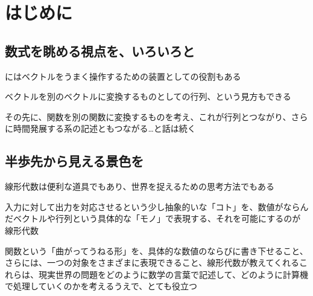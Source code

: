 \documentclass[../book_half_step_linear]{subfiles}
\begin{document}
\section{はじめに}

\subsection{数式を眺める視点を、いろいろと}

にはベクトルをうまく操作するための装置としての役割もある

ベクトルを別のベクトルに変換するものとしての行列、という見方もできる

その先に、関数を別の関数に変換するものを考え、これが行列とつながり、さらに時間発展する系の記述ともつながる…と話は続く

\sectionline

\subsection{半歩先から見える景色を}

線形代数は便利な道具でもあり、世界を捉えるための思考方法でもある

入力に対して出力を対応させるという少し抽象的いな「コト」を、数値がならんだベクトルや行列という具体的な「モノ」で表現する、それを可能にするのが線形代数

関数という「曲がってうねる形」を、具体的な数値のならびに書き下せること、さらには、一つの対象をさまざまに表現できること、線形代数が教えてくれるこれらは、現実世界の問題をどのように数学の言葉で記述して、どのように計算機で処理していくのかを考えるうえで、とても役立つ
\end{document}
